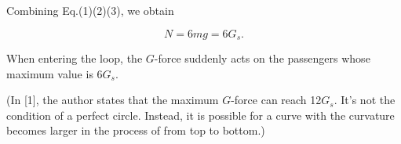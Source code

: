 \documentclass{article}
\begin{document}
    Combining Eq.(1)(2)(3), we obtain

    $$
    N=6mg=6G_s.
    $$


    When entering the loop, the $G$-force suddenly acts on the passengers whose maximum value is $6G_s$.

    (In [1], the author states that the maximum $G$-force can reach 12$G_s$. It's not the condition of a perfect circle. Instead, it is possible for a curve with the curvature becomes larger in the process of from top to bottom.)
\end{document}
